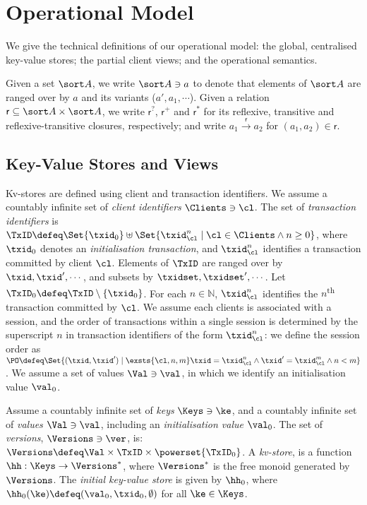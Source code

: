 \section{Operational Model}
\label{sec:model}

We give the technical definitions of our operational model: 
the global, centralised key-value stores; the partial client views;  and the
operational semantics. 

Given a set $\sort A$, we write $\sort A \ni a$ to denote that elements of $\sort A$ are ranged over by $a$ and its variants (\eg $a', a_1, \cdots$). 
Given a relation $\mathsf r \subseteq \sort A \times \sort A$,
we write $\mathsf r^?$, $\mathsf r^+$ and $\mathsf r^*$ for its reflexive, transitive and reflexive-transitive closures, respectively;
and write $a_1 \xrightarrow{\mathsf r} a_2$ for $(a_1, a_2) \in \mathsf r$.
\subsection{Key-Value Stores and Views}
\label{subsec:kvstores}
\label{sec:mkvs-view}
Kv-stores are defined using client and transaction identifiers.
We assume a countably infinite set of \emph{client identifiers} $\Clients \ni \cl$. 
The set of \emph{transaction identifiers} is  
$\TxID \defeq  \Set{\txid_{0}} \uplus \Set{ \txid_{\cl}^{n} \mid \cl
  \in \Clients \wedge n \geq 0 }$, 
where  $\txid_0$ denotes  an \emph{initialisation transaction}, 
and $\txid_{\cl}^{n}$ identifies a transaction committed by client $\cl$. 
Elements of $\TxID$ are ranged over by
$\txid, \txid', \cdots$, and subsets by $\txidset, \txidset', \cdots$. 
Let $\TxID_{0} \defeq \TxID \setminus \{ \txid_0\}$. 
For each $n \in \mathbb{N}$, $\txid_{\cl}^{n}$ identifies the $n$\textsuperscript{th} transaction  committed by $\cl$.
We assume each clients is associated with a session, 
and the order of transactions within a single session is determined by the superscript 
$n$ in transaction identifiers of the form $\txid_{\cl}^{n}$: we define the session order 
as 
$\PO \defeq \Set{ (\txid, \txid') \mid \exsts{ \cl, n,m } \txid =
  \txid_{\cl}^{n} \wedge \txid' = \txid_{\cl}^{m} \wedge n < m}$.
We assume a set of values $\Val \ni \val$, in which 
we identify an initialisation value $\val_0$.

\begin{definition}[Kv-stores]
\label{def:his_heap}
\label{def:mkvs}
Assume a countably infinite set of \emph{keys} $\Keys \ni \ke$, 
and a countably infinite set of  \emph{values} $\Val \ni \val$, 
including an \emph{initialisation value} $\val_0 $.
The set of \emph{versions}, $\Versions \ni \ver$, is: $\Versions \defeq \Val \times \TxID \times \powerset{\TxID_{0}}$. 
A \emph{kv-store}, 
is a function $\hh: \Keys \rightarrow \Versions^{\ast}$, 
where $\Versions^{\ast}$ is the free monoid generated by $\Versions$. 
The \emph{initial key-value store} is given by $\hh_0$, where 
$\hh_{0}(\ke)\defeq  (\val_0, \txid_0, \emptyset)$ for
all $\ke \in \Keys$.
\end{definition}

